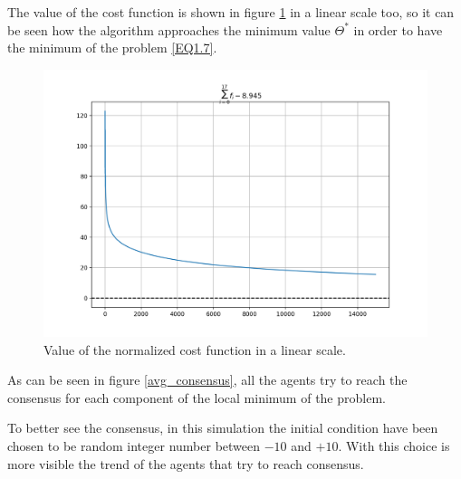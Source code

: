 \documentclass[a4paper,11pt,oneside]{book}
\begin{document}
The value of the cost function is shown in figure \ref{lin_cost} in a linear scale too, so it can be seen how the algorithm approaches the minimum value $\Theta^{*}$ in order to have the minimum of the problem \ref{EQ1.7}.

\begin{figure}[ht]
	\centering
	\includegraphics[scale=0.4]{figs/cost_linear_scale}
	\caption{Value of the normalized cost function in a linear scale. }
	\label{lin_cost}
\end{figure}

As can be seen in figure \ref{avg_consensus}, all the agents try to reach the consensus for each component of the local minimum of the problem. 

To better see the consensus, in this simulation the initial condition have been chosen to be random integer number between $-10$ and $+10$. With this choice is more visible the trend of the agents that try to reach consensus.
\end{document}
